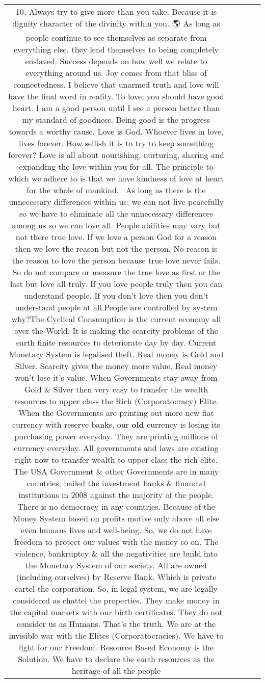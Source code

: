 \documentclass[11pt]{article}
\newlength\mylength
\begin{document}
\begin{center}
\begin{longtable}{|C{.65\mylength}|C{.30\mylength}|C{.12\mylength}|C{.12\mylength}|C{.12\mylength}|}
10, Always try to give more than you take. 
Because it is dignity character of the divinity within you.
🌎 As long as people continue to see themselves as separate from everything else, they lend themselves to being completely enslaved. Success depends on how well we relate to everything around us. Joy comes from that bliss of connectedness. I believe that unarmed truth and love will have the final word in reality. To love; you should have good heart. I am a good person until I see a person better than my standard of goodness. Being good is the progress towards a worthy cause. Love is God. Whoever lives in love, lives forever. How selfish it is to try to keep something forever? Love is all about nourishing, nurturing, sharing and expanding the love within you for all. The principle to which we adhere to is that we have kindness of love at heart for the whole of mankind.  As long as there is the unnecessary differences within us; we can not live peacefully so we have to eliminate all the unnecessary differences among us so we can love all. People abilities may vary but not there true love. If we love a person God for a reason then we love the reason but not the person. No reason is the reason to love the person because true love never fails. So do not compare or measure the true love as first or the last but love all truly. If you love people truly then you can understand people. If you don't love then you don't understand people at all.People are controlled by system why?The Cyclical Consumption is the current economy all over the World. It is making the scarcity problems of the earth finite resources to deteriorate day by day. Current Monetary System is legalised theft. Real money is Gold and Silver. Scarcity gives the money more value. Real money won't lose it's value. When Governments stay away from Gold \& Silver then very easy to transfer the wealth  resources to upper class the Rich (Corporatocracy) Elite. When the Governments are printing out more new fiat currency with reserve banks, our \textbf{old} currency is losing its purchasing power everyday. They are printing millions of currency everyday. All governments and laws are existing right now to transfer wealth to upper class the rich elite. The USA Government \& other Governments are in many countries, bailed the investment banks \& financial institutions in 2008 against the majority of the people. There is no democracy in any countries. Because of the Money System based on profits motive only above all else even humans lives and well-being. So, we do not have freedom to protect our values with the money so on. The violence, bankruptcy \& all the negativities are build into the Monetary System of our society. All are owned (including ourselves) by Reserve Bank. Which is private cartel the corporation. So, in legal system, we are legally considered as chattel the properties. They make money in the capital markets with our birth certificates. They do not consider us as Humans. That's the truth. We are at the invisible war with the Elites (Corporatocracies). We have to fight for our Freedom. Resource Based Economy is the Solution. We have to declare the earth resources as the heritage of all the people 
\end{longtable}
\end{center}
\end{document}
